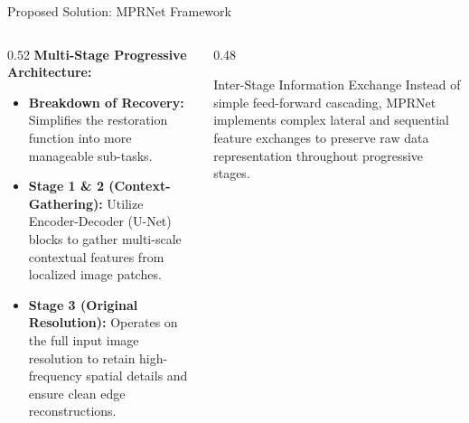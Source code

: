 \documentclass[aspectratio=169]{beamer}
\begin{document}
\begin{frame}{Proposed Solution: MPRNet Framework}
    \begin{columns}
        \begin{column}{0.52\textwidth}
            \textbf{Multi-Stage Progressive Architecture:}
            \begin{itemize}
                \item \textbf{Breakdown of Recovery:} Simplifies the restoration function into more manageable sub-tasks.
                \item \textbf{Stage 1 \& 2 (Context-Gathering):} Utilize Encoder-Decoder (U-Net) blocks to gather multi-scale contextual features from localized image patches.
                \item \textbf{Stage 3 (Original Resolution):} Operates on the full input image resolution to retain high-frequency spatial details and ensure clean edge reconstructions.
            \end{itemize}
        \end{column}
        \begin{column}{0.48\textwidth}
            \begin{block}{Inter-Stage Information Exchange}
                Instead of simple feed-forward cascading, MPRNet implements complex lateral and sequential feature exchanges to preserve raw data representation throughout progressive stages.
            \end{block}
        \end{column}
    \end{columns}
\end{frame}
\end{document}
